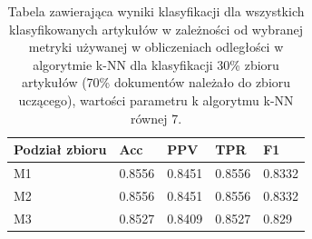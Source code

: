 \documentclass{classrep}
\begin{document}
\begin{table}[H]
    \centering
\caption{Tabela zawierająca wyniki klasyfikacji dla wszystkich klasyfikowanych artykułów w zależności od wybranej metryki
używanej w obliczeniach odległości w algorytmie k-NN dla klasyfikacji 30\% zbioru
artykułów (70\% dokumentów należało do zbioru uczącego), wartości parametru k
algorytmu k-NN równej 7.}
\begin{adjustbox}{max width=\textwidth}
    \begin{tabular}{|l|l|l|l|l|}
    \hline
        Podział zbioru & Acc & PPV & TPR & F1 \\ \hline
        M1 & 0.8556 & 0.8451 & 0.8556 & 0.8332 \\ \hline
        M2 & 0.8556 & 0.8451 & 0.8556 & 0.8332 \\ \hline
        M3 & 0.8527 & 0.8409 & 0.8527 & 0.829 \\ \hline
    \end{tabular}
\end{adjustbox}
\end{table}
\end{document}
